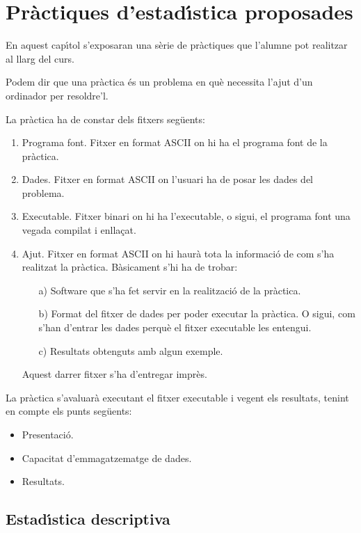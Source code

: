 \chapter{Pr\`actiques d'estad\'{\i}stica proposades}

En aquest cap\'{\i}tol s'exposaran una s\`erie de pr\`actiques que 
l'alumne pot realitzar al llarg del curs.

Podem dir que una pr\`actica \'es un problema en qu\`e necessita l'ajut d'un
ordinador per resoldre'l.

La pr\`actica ha de constar dels fitxers seg\"uents:
\begin{enumerate}
\item Programa font. 
Fitxer en format ASCII 
on hi ha el programa font de 
la pr\`actica.

\item Dades. Fitxer en format ASCII 
on l'usuari ha de posar les dades del problema.

\item Executable. Fitxer 
binari on hi ha l'executable, o sigui, el
programa font una vegada compilat 
i enlla\c{c}at.

\item Ajut. Fitxer en format ASCII 
on hi haur\`a tota la informaci\'o de
com s'ha realitzat la pr\`actica. B\`asicament s'hi ha de trobar:
\begin{itemize}
\item[a)] Software que s'ha fet servir en la realitzaci\'o de la
pr\`actica.
\item[b)] Format del fitxer de dades per poder executar la pr\`actica. 
O sigui, com s'han d'entrar les dades perqu\`e el fitxer 
executable les entengui.
\item[c)] Resultats obtenguts amb algun exemple.
\end{itemize}
Aquest darrer fitxer s'ha d'entregar impr\`es.
\end{enumerate} 

La pr\`actica s'avaluar\`a executant el fitxer 
executable i vegent els resultats, tenint en compte els punts seg\"uents:
\begin{itemize}
\item Presentaci\'o.
\item Capacitat d'emmagatzematge de dades.
\item Resultats.
\end{itemize}

\section{Estad\'{\i}stica descriptiva
}


